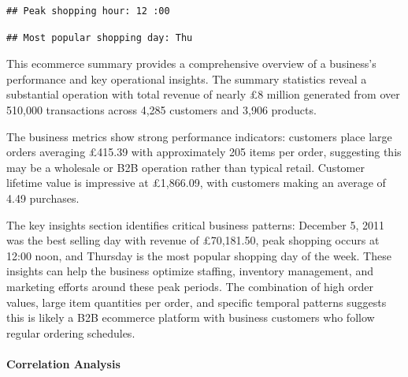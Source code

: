 \documentclass[
]{article}
\newenvironment{Shaded}{\begin{snugshade}}{\end{snugshade}}
\newcommand{\CommentTok}[1]{\textcolor[rgb]{0.56,0.35,0.01}{\textit{#1}}}
\newcommand{\DecValTok}[1]{\textcolor[rgb]{0.00,0.00,0.81}{#1}}
\newcommand{\FunctionTok}[1]{\textcolor[rgb]{0.13,0.29,0.53}{\textbf{#1}}}
\newcommand{\NormalTok}[1]{#1}
\newcommand{\OtherTok}[1]{\textcolor[rgb]{0.56,0.35,0.01}{#1}}
\newcommand{\SpecialCharTok}[1]{\textcolor[rgb]{0.81,0.36,0.00}{\textbf{#1}}}
\newcommand{\StringTok}[1]{\textcolor[rgb]{0.31,0.60,0.02}{#1}}
\begin{document}
\begin{verbatim}
## Peak shopping hour: 12 :00
\end{verbatim}

\begin{Shaded}
\end{Shaded}

\begin{verbatim}
## Most popular shopping day: Thu
\end{verbatim}

This ecommerce summary provides a comprehensive overview of a business's
performance and key operational insights. The summary statistics reveal
a substantial operation with total revenue of nearly £8 million
generated from over 510,000 transactions across 4,285 customers and
3,906 products.

The business metrics show strong performance indicators: customers place
large orders averaging £415.39 with approximately 205 items per order,
suggesting this may be a wholesale or B2B operation rather than typical
retail. Customer lifetime value is impressive at £1,866.09, with
customers making an average of 4.49 purchases.

The key insights section identifies critical business patterns: December
5, 2011 was the best selling day with revenue of £70,181.50, peak
shopping occurs at 12:00 noon, and Thursday is the most popular shopping
day of the week. These insights can help the business optimize staffing,
inventory management, and marketing efforts around these peak periods.
The combination of high order values, large item quantities per order,
and specific temporal patterns suggests this is likely a B2B ecommerce
platform with business customers who follow regular ordering
schedules.\newpage

\paragraph{Correlation Analysis}\label{correlation-analysis}
\end{document}
